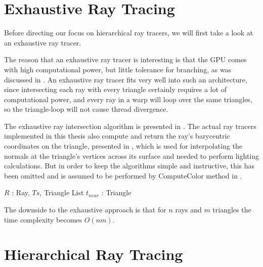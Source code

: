 \section{Exhaustive Ray Tracing} \label{sec:exhaustive}

Before directing our focus on hierarchical ray tracers, we will first
take a look at an exhaustive ray tracer.


The reason that an exhaustive ray tracer is interesting is that the GPU comes
with high computational power, but little tolerance for branching, as was
discussed in . An exhaustive ray tracer fits
very well into such an architecture, since intersecting each ray with every
triangle certainly requires a lot of computational power, and every ray in a
warp will loop over the same triangles, so the triangle-loop will not cause
thread divergence.


The exhaustive ray intersection algorithm is presented in
. The actual ray tracers implemented in this thesis also
compute and return the ray's barycentric coordinates on the triangle, presented
in , which is used for interpolating the normals at
the triangle's vertices across its surface and needed to perform lighting
calculations. But in order to keep the algorithms simple and instructive, this
has been omitted and is assumed to be performed by ComputeColor method in
.


\begin{algorithm}
  \caption{Exhaustive ray tracer}
  \label{alg:exhaustive}
  \begin{algorithmic}
              {$R$ : Ray, $Ts$, Triangle List}
              {$t_{near}$ : Triangle}{
                \ENDFOR
              }
  \end{algorithmic}
\end{algorithm}

The downside to the exhaustive approach is that for $n$ rays and $m$
triangles the time complexity becomes $O(nm)$.

\section{Hierarchical Ray Tracing}\label{sec:hierarchicalTraversal}

